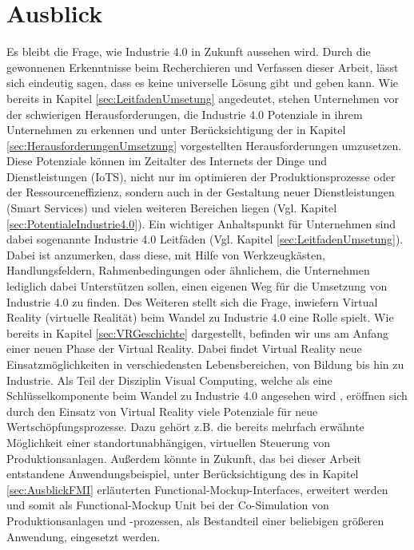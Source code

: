 \section{Ausblick}\label{sec:Ausblick}
Es bleibt die Frage, wie Industrie 4.0 in Zukunft aussehen wird. Durch die gewonnenen Erkenntnisse beim Recherchieren und Verfassen dieser Arbeit, lässt sich eindeutig sagen, dass es keine universelle Lösung gibt und geben kann. Wie bereits in Kapitel \ref{sec:LeitfadenUmsetung} angedeutet, stehen Unternehmen vor der schwierigen Herausforderungen, die Industrie 4.0 Potenziale in ihrem Unternehmen zu erkennen und unter Berücksichtigung der in Kapitel \ref{sec:HerausforderungenUmsetzung} vorgestellten Herausforderungen umzusetzen. Diese Potenziale können im Zeitalter des Internets der Dinge und Dienstleistungen (IoTS), nicht nur im optimieren der Produktionsprozesse oder der Ressourceneffizienz, sondern auch in der Gestaltung neuer Dienstleistungen (Smart Services) und vielen weiteren Bereichen liegen (Vgl. Kapitel \ref{sec:PotentialeIndustrie4.0}). 
Ein wichtiger Anhaltspunkt für Unternehmen sind dabei sogenannte Industrie 4.0 Leitfäden (Vgl. Kapitel \ref{sec:LeitfadenUmsetung}). Dabei ist anzumerken, dass diese, mit Hilfe von Werkzeugkästen, Handlungsfeldern, Rahmenbedingungen oder ähnlichem, die Unternehmen lediglich dabei Unterstützen sollen, einen eigenen Weg für die Umsetzung von Industrie 4.0 zu finden.
\newline
Des Weiteren stellt sich die Frage, inwiefern Virtual Reality (virtuelle Realität) beim Wandel zu Industrie 4.0 eine Rolle spielt. Wie bereits in Kapitel \ref{sec:VRGeschichte} dargestellt, befinden wir uns am Anfang einer neuen Phase der Virtual Reality. Dabei findet Virtual Reality neue Einsatzmöglichkeiten in verschiedensten Lebensbereichen, von Bildung bis hin zu Industrie. Als Teil der Disziplin Visual Computing, welche als eine Schlüsselkomponente beim Wandel zu Industrie 4.0 angesehen wird \cite[S.1]{17}, eröffnen sich durch den Einsatz von Virtual Reality viele Potenziale für neue Wertschöpfungsprozesse. Dazu gehört z.B. die bereits mehrfach erwähnte Möglichkeit einer standortunabhängigen, virtuellen Steuerung von Produktionsanlagen.
\newline
Außerdem könnte in Zukunft, das bei dieser Arbeit entstandene Anwendungsbeispiel, unter Berücksichtigung des in Kapitel \ref{sec:AusblickFMI} erläuterten Functional-Mockup-Interfaces, erweitert werden und somit als Functional-Mockup Unit bei der Co-Simulation von Produktionsanlagen und -prozessen, als Bestandteil einer beliebigen größeren Anwendung, eingesetzt werden.
